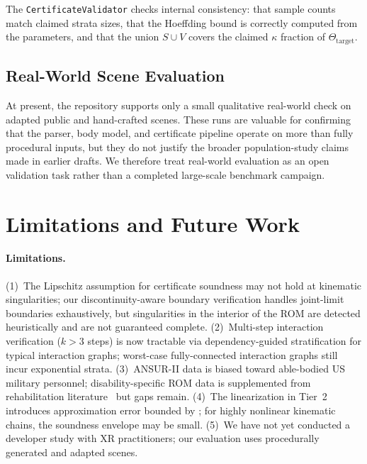 \documentclass[11pt,letterpaper]{article}
\newcommand{\param}{\Theta}
\begin{document}
The \texttt{CertificateValidator} checks internal consistency: that sample counts match claimed strata sizes, that the Hoeffding bound is correctly computed from the parameters, and that the union $S \cup V$ covers the claimed $\kappa$ fraction of $\param_{\mathrm{target}}$.

\subsection{Real-World Scene Evaluation}
\label{sec:realworld-eval}

At present, the repository supports only a small qualitative real-world check on
adapted public and hand-crafted scenes.  These runs are valuable for confirming
that the parser, body model, and certificate pipeline operate on more than fully
procedural inputs, but they do not justify the broader population-study claims
made in earlier drafts.  We therefore treat real-world evaluation as an open
validation task rather than a completed large-scale benchmark campaign.

\section{Limitations and Future Work}
\label{sec:limitations}

\paragraph{Limitations.}
(1)~The Lipschitz assumption for certificate soundness may not hold at kinematic singularities; our discontinuity-aware boundary verification handles joint-limit boundaries exhaustively, but singularities in the interior of the ROM are detected heuristically and are not guaranteed complete.
(2)~Multi-step interaction verification ($k > 3$ steps) is now tractable via dependency-guided stratification for typical interaction graphs; worst-case fully-connected interaction graphs still incur exponential strata.
(3)~ANSUR-II data is biased toward able-bodied US military personnel; disability-specific ROM data is supplemented from rehabilitation literature~\cite{boone1979,soucie2011} but gaps remain.
(4)~The linearization in Tier~2 introduces approximation error bounded by ; for highly nonlinear kinematic chains, the soundness envelope may be small.
(5)~We have not yet conducted a developer study with XR practitioners; our evaluation uses procedurally generated and adapted scenes.
\end{document}
